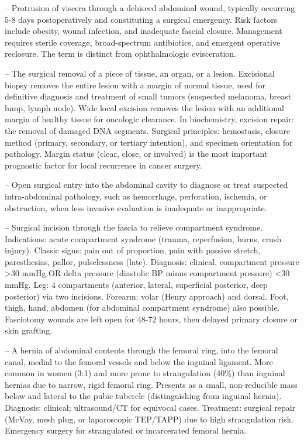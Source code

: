 -- Protrusion of viscera through a dehisced abdominal wound, typically occurring 5-8 days postoperatively and constituting a surgical emergency. Risk factors include obesity, wound infection, and inadequate fascial closure. Management requires sterile coverage, broad-spectrum antibiotics, and emergent operative reclosure. The term is distinct from ophthalmologic evisceration.

-- The surgical removal of a piece of tissue, an organ, or a lesion. Excisional biopsy removes the entire lesion with a margin of normal tissue, used for definitive diagnosis and treatment of small tumors (suspected melanoma, breast lump, lymph node). Wide local excision removes the lesion with an additional margin of healthy tissue for oncologic clearance. In biochemistry, excision repair: the removal of damaged DNA segments. Surgical principles: hemostasis, closure method (primary, secondary, or tertiary intention), and specimen orientation for pathology. Margin status (clear, close, or involved) is the most important prognostic factor for local recurrence in cancer surgery.

-- Open surgical entry into the abdominal cavity to diagnose or treat suspected intra-abdominal pathology, such as hemorrhage, perforation, ischemia, or obstruction, when less invasive evaluation is inadequate or inappropriate.

-- Surgical incision through the fascia to relieve compartment syndrome. Indications: acute compartment syndrome (trauma, reperfusion, burns, crush injury). Classic signs: pain out of proportion, pain with passive stretch, paresthesias, pallor, pulselessness (late). Diagnosis: clinical, compartment pressure >30 mmHg OR delta pressure (diastolic BP minus compartment pressure) <30 mmHg. Leg: 4 compartments (anterior, lateral, superficial posterior, deep posterior) via two incisions. Forearm: volar (Henry approach) and dorsal. Foot, thigh, hand, abdomen (for abdominal compartment syndrome) also possible. Fasciotomy wounds are left open for 48-72 hours, then delayed primary closure or skin grafting.

-- A hernia of abdominal contents through the femoral ring, into the femoral canal, medial to the femoral vessels and below the inguinal ligament. More common in women (3:1) and more prone to strangulation (40\%) than inguinal hernias due to narrow, rigid femoral ring. Presents as a small, non-reducible mass below and lateral to the pubic tubercle (distinguishing from inguinal hernia). Diagnosis: clinical; ultrasound/CT for equivocal cases. Treatment: surgical repair (McVay, mesh plug, or laparoscopic TEP/TAPP) due to high strangulation risk. Emergency surgery for strangulated or incarcerated femoral hernia.

